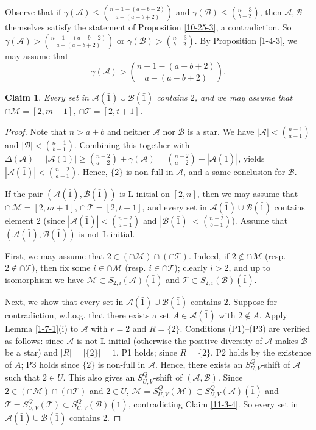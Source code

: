\documentclass[11pt]{article}
\def\marrow{{\boldmath {\marginpar[\hfill$\rightarrow \rightarrow$]{$\leftarrow \leftarrow$}}}}
\def\andrey#1{{\sc Andrey: }{\marrow\sf \textcolor{blue}{#1}}}
\newcommand{\m}{\mathcal}
\newtheorem{claim}[theorem]{Claim}
\begin{document}
Observe that if $\gamma(\mathcal{A})\le {n-1-(a-b+2)
\choose a-(a-b+2)}$ and $\gamma(\mathcal{B})\le {n-3\choose b-2}$, then $\m A, \m B$ themselves satisfy the statement of Proposition \ref{10-25-3}, a contradiction. So  $\gamma(\mathcal{A})> {n-1-(a-b+2)
\choose a-(a-b+2)}$ or $\gamma(\mathcal{B})> {n-3\choose b-2}$.
 By Proposition \ref{1-4-3}, 
 we may assume that $$\gamma(\mathcal{A})> {n-1-(a-b+2)
\choose a-(a-b+2)}.$$ 

\begin{claim}\label{step1.1}
Every set in $\mathcal{A}(\bar{1})\cup \mathcal{B}(\bar{1})$ contains $2$, and we may assume that $\cap \m M=[2,m+1]$, $\cap \m T=[2,t+1]$.
\end{claim} 

\begin{proof}
Note that $n>a+b$ and neither $\m A$ nor $\m B$ is a star.
We have $|\m A|<{n-1\choose a-1}$ and $|\m B|<{n-1\choose b-1}$. 
Combining this together with $\Delta(\m A)=|\m A(1)|\ge {n-2\choose a-2}+\gamma(\m A)={n-2\choose a-2}+|\m A(\bar1)|$,
yields $|\m A(\bar1)|<{n-2\choose a-1}$. Hence,
$\{2\}$ is non-full in $\mathcal{A}$, and a same conclusion for $\m B$. 

If the pair $(\mathcal{A}(\bar{1}), \mathcal{B}(\bar{1}))$ is L-initial on $[2,n]$, then we may assume that $\cap\, \m M=[2,m+1]$, $\cap\, \m T=[2,t+1]$, and every set in $\mathcal{A}(\bar{1})\cup \mathcal{B}(\bar{1})$ contains element $2$ (since $|\m A(\bar1)|<{n-2\choose a-1}$ and $|\m B(\bar1)|<{n-2\choose b-1}$).  
Assume that $(\mathcal{A}(\bar{1}), \mathcal{B}(\bar{1}))$ is not L-initial.  

First, we may assume that $2 \in (\cap \m M)\cap (\cap \m T)$. Indeed, if $2 \not \in \cap \m M$ (resp. $2 \not \in \cap \m T$), then fix some  $i\in \cap \m M$ (resp. $i\in \cap \m T$); clearly $i>2$, and up to isomorphism we have $\m M \subset S_{2,i}(\m A)(\bar1)$ and  $\m T \subset S_{2,i}(\m B)(\bar{1})$.  

Next, we show that  every set in $\mathcal{A}(\bar{1})\cup \mathcal{B}(\bar{1})$ contains $2$. 
Suppose for contradiction, w.l.o.g. that there exists a set $A\in \m A(\bar1)$ with $2\not\in A$. 
Apply Lemma \ref{1-7-1}(i) to $\m A$ with $r=2$ and $R=\{2\}$. 
Conditions (P1)--(P3) are verified as follows: since $\m A$ is not L-initial (otherwise the positive diversity of $\m A$ makes $\m B$ be a star)  and $|R|=|\{2\}|=1$, P1 holds; since $R=\{2\}$, P2 holds by the existence of $A$; P3 holds since $\{2\}$ is non-full in $\mathcal{A}$. 
Hence, there exists an $S_{U,V}^Q$-shift of $\mathcal{A}$ such that $2\in U$. This also gives an $S_{U,V}^Q$-shift of $(\m A, \m B)$. 
Since $2 \in (\cap \m M)\cap (\cap \m T)$ and $2\in U$, $\m M=S_{U,V}^Q(\m M)\subset S_{U,V}^Q(\m A)(\bar{1})$ and $\m T=S_{U,V}^Q(\m T)\subset S_{U,V}^Q(\m B)(\bar1)$, contradicting Claim \ref{11-3-4}. So every set in $\mathcal{A}(\bar{1})\cup \mathcal{B}(\bar{1})$ contains $2$.


\end{proof}
\end{document}
